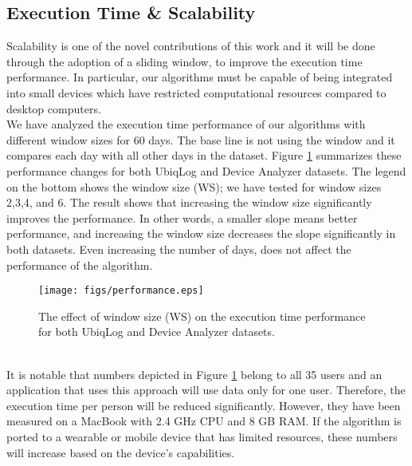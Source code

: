 \documentclass{sig-alternate}
\begin{document}
\subsection{Execution Time \& Scalability} \label{exectimescal}
Scalability is one of the novel contributions of this work and it will be done through the adoption of a sliding window, to improve the execution time performance. In particular, our algorithms must be capable of being integrated into small devices which have restricted computational resources compared to desktop computers. \\
We have analyzed the execution time performance of our algorithms with different window sizes for 60 days. The base line is not using the window and it compares each day with all other days in the dataset. Figure \ref{fig:performance} summarizes these performance changes for both UbiqLog and Device Analyzer datasets. The legend on the bottom shows the window size (WS); we have tested for window sizes 2,3,4, and 6. The result shows that increasing the window size significantly improves the performance. In other words, a smaller slope means better performance, and increasing the window size decreases the slope significantly in both datasets. Even increasing the number of days, does not affect the performance of the algorithm. 
\vspace{-0.3cm}
\begin{figure}[h]
	\hbox{\hspace{-3ex}\texttt{[image: figs/performance.eps]}}
	 \vspace{-0.4cm}
		\caption{\small The effect of window size (WS) on the execution time performance for both UbiqLog and Device Analyzer datasets.}\label{fig:performance}
\end{figure}\\
It is notable that numbers depicted in Figure \ref{fig:performance} belong to all 35 users and an application that uses this approach will use data only for one user. Therefore, the execution time per person will be reduced significantly. However, they have been measured on a MacBook with 2.4 GHz CPU and 8 GB RAM. If the algorithm is ported to a wearable or mobile device that has limited resources, these numbers will increase based on the device's capabilities.
\vfill{}
\end{document}
